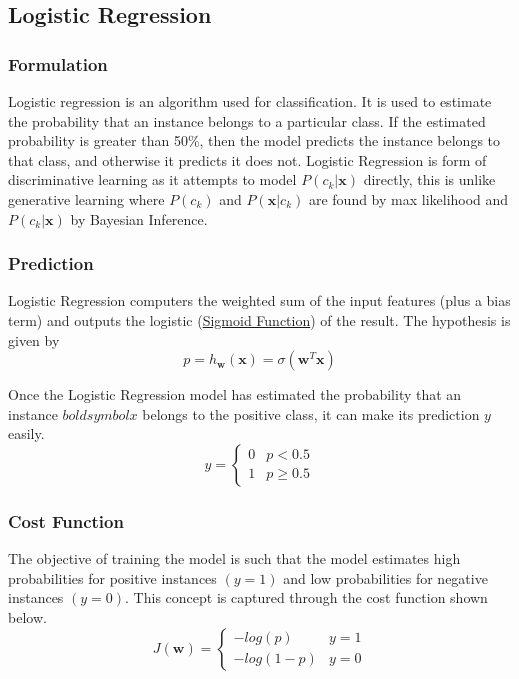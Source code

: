 \documentclass[12pt]{article}
\begin{document}
    \subsection{Logistic Regression}
        \subsubsection{Formulation}
            Logistic regression is an algorithm used for classification. It is used to estimate the probability that an instance belongs to a particular class. If the estimated probability is
            greater than 50\%, then the model predicts the instance belongs to that class, and otherwise it predicts it does not. Logistic Regression is form of discriminative learning as it attempts 
            to model $P(c_k|\boldsymbol{x})$ directly, this is unlike generative learning where $P(c_k)$ and $P(\boldsymbol{x}|c_k)$ are found by max likelihood and $P(c_k|\boldsymbol{x})$ by Bayesian Inference.

        \subsubsection{Prediction}
            Logistic Regression computers the weighted sum of the input features (plus a bias term) and outputs the logistic (\hyperlink{sigmoid function}{Sigmoid Function}) of the result. The hypothesis is given by
            $$ p = h_{\boldsymbol{w}}(\boldsymbol{x}) = \sigma(\boldsymbol{w}^T\boldsymbol{x}) $$
            
            Once the Logistic Regression model has estimated the probability that an instance $boldsymbol{x}$ belongs to the positive class, it can make its prediction $y$ easily.
            \[ y = 
                \begin{cases} 
                    0 & p < 0.5 \\
                    1 & p\geq 0.5 
                \end{cases}
            \]
        
        \subsubsection{Cost Function}
            The objective of training the model is such that the model estimates high probabilities for positive instances $(y = 1)$ and low probabilities for negative instances $(y = 0)$.
            This concept is captured through the cost function shown below.
            \[ J(\boldsymbol{w}) = 
                \begin{cases}
                    -log(p) & y = 1 \\
                    -log(1-p) & y = 0
                \end{cases}
            \]
            
\end{document}
